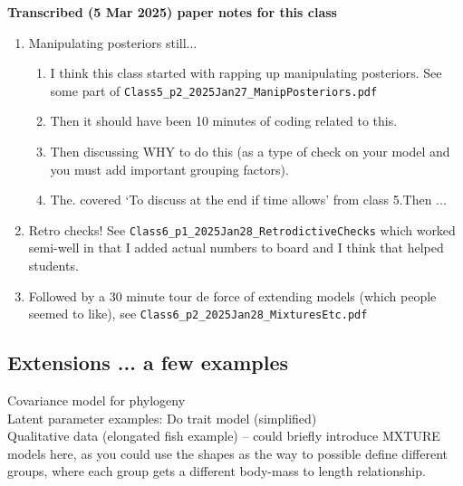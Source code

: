 \documentclass[11pt]{article}
\begin{document}
{\bf Transcribed (5 Mar 2025) paper notes for this class}\\

\begin{enumerate}
\item Manipulating posteriors still...
\begin{enumerate}
\item I think this class started with rapping up manipulating posteriors. See some part of \verb|Class5_p2_2025Jan27_ManipPosteriors.pdf| 
\item Then it should have been 10 minutes of coding related to this.
\item Then discussing WHY to do this (as a type of check on your model and you must add important grouping factors).
\item  The. covered `To discuss at the end if time allows' from class 5.Then ... 
\end{enumerate}
\item Retro checks!  See \verb|Class6_p1_2025Jan28_RetrodictiveChecks| which worked semi-well in that I added actual numbers to board and I think that helped students. 
\item Followed by a 30 minute tour de force of extending models (which people seemed to like), see \verb|Class6_p2_2025Jan28_MixturesEtc.pdf|
 \end{enumerate}

 
\iffalse
- PREP Retrodictive check code for Deirdre data -- no grouping model (RStan), do retrodictive, then add grouping and try again (OR use the workflow example from Heather's model!)
- Prep math from phylo model
- Prep math from simplified trait model
- Prep math for mixture (use U Toronto) notation ... `unsupervised learning'
\fi



\subsection{Extensions ... a few examples}

Covariance model for phylogeny\\
Latent parameter examples: Do trait model (simplified)\\
Qualitative data (elongated fish example) -- could briefly introduce MXTURE models here, as you could use the shapes as the way to possible define different groups, where each group gets a different body-mass to length relationship. 
\end{document}
